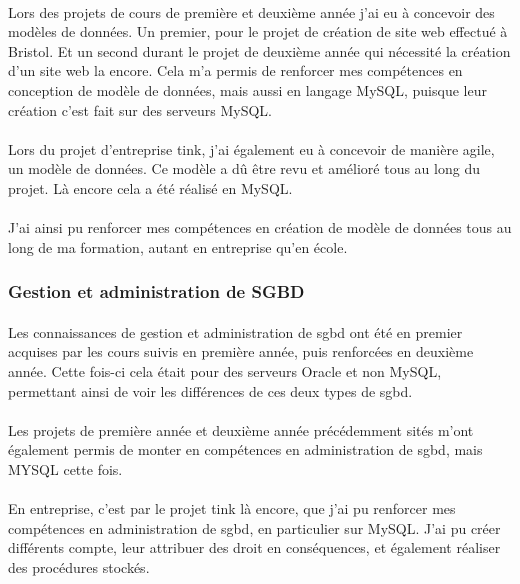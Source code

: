\documentclass[12pt,a4paper]{report}
\begin{document}
\paragraph*{}Lors des projets de cours de première et deuxième année j'ai eu à concevoir des modèles de données. Un premier, pour le projet de création de site web effectué à Bristol. Et un second durant le projet de deuxième année qui nécessité la création d'un site web la encore. Cela m'a permis de renforcer mes compétences en conception de modèle de données, mais aussi en langage MySQL, puisque leur création c'est fait sur des serveurs MySQL.
\paragraph*{}Lors du projet d'entreprise \gls{tink}, j'ai également eu à concevoir de manière agile, un modèle de données. Ce modèle a dû être revu et amélioré tous au long du projet. Là encore cela a été réalisé en MySQL.
\paragraph*{}J'ai ainsi pu renforcer mes compétences en création de modèle de données tous au long de ma formation, autant en entreprise qu'en école. \\
\subsubsection{Gestion et administration de SGBD}
\paragraph*{}Les connaissances de gestion et administration de \gls{sgbd} ont été en premier acquises par les cours suivis en première année, puis renforcées en deuxième année. Cette fois-ci cela était pour des serveurs Oracle et non MySQL, permettant ainsi de voir les différences de ces deux types de \gls{sgbd}.
\paragraph*{}Les projets de première année et deuxième année précédemment sités m'ont également permis de monter en compétences en administration de \gls{sgbd}, mais MYSQL cette fois.
\paragraph*{}En entreprise, c'est par le projet \gls{tink} là encore, que j'ai pu renforcer mes compétences en administration de \gls{sgbd}, en particulier sur MySQL. J'ai pu créer différents compte, leur attribuer des droit en conséquences, et également réaliser des procédures stockés. \\
\end{document}
